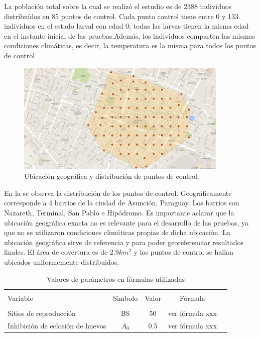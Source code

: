 
La población total sobre la cual se realizó el estudio es de 2388 individuos
distribuídos en 85 puntos de control. Cada punto control tiene entre 0 y 133
individuos en el estado larval con edad 0; todas las larvas tienen la misma edad
en el instante inicial de las pruebas.Además, los individuos comparten
las mismas condiciones climáticas, es decir, la temperatura es la misma
para todos los puntos de control \\

\begin{figure}
\centering
\includegraphics[width=0.9\textwidth]{./capitulo-6/graphics/puntoscontroldistribuido.png}
\caption{\label{fig:distribucion-puntos}Ubicación geográfica y distribución de puntos de control.}
\end{figure}


En la  se observa la distribución de los puntos de control.
Geográficamente corresponde a 4 barrios de la ciudad de Asunción, Paraguay. Los barrios son
Nazareth, Terminal, San Pablo e Hipódromo. Es importante aclarar que la ubicación geográfica
exacta no es relevante para el desarrollo de las pruebas, ya que no se utilizaron
condiciones climáticas propias de dicha ubicación. La ubicación geográfica sirve
de referencia y para poder georeferenciar resultados finales. El área de covertura
es de 2.9$km^2$ y los puntos de control se hallan ubicados uniformemente distribuidos.\\


\begin{table}
    \begin{center}
        \caption{ \label{tab:valores-formulas} Valores de parámetros en fórmulas utilizadas}
        \begin{tabular}{p{3cm} c c c c}
            \hline \\
            Variable & Simbolo & Valor & Fórmula \\
            \hline
            \hline \\
            Sitios de reproducción &  BS & 50 & ver fórmula xxx\\
            Inhibición de eclosión de huevos & $A_{0}$ & 0.5 & ver fórmula xxx\\
        \end{tabular}
    \end{center}
\end{table}

